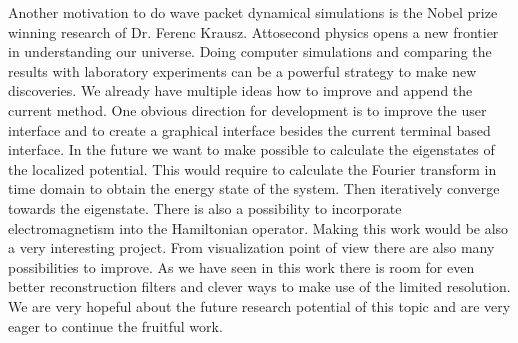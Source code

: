 Another motivation to do wave packet dynamical simulations is the Nobel prize winning research of Dr. Ferenc Krausz. Attosecond physics opens a new frontier in understanding our universe.
Doing computer simulations and comparing the results with laboratory experiments can be a powerful strategy to make new discoveries.
We already have multiple ideas how to improve and append the current method.
One obvious direction for development is to improve the user interface and to create a graphical interface besides the current terminal based interface.
In the future we want to make possible to calculate the eigenstates of the localized potential.
This would require to calculate the Fourier transform in time domain to obtain the energy state of the system.
Then iteratively converge towards the eigenstate.
There is also a possibility to incorporate electromagnetism into the Hamiltonian operator.
Making this work would be also a very interesting project.
From visualization point of view there are also many possibilities to improve.
As we have seen in this work there is room for even better reconstruction filters
and clever ways to make use of the limited resolution.
We are very hopeful about the future research potential of this topic and are very eager to continue the fruitful work.

 

